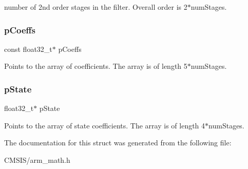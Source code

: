 number of 2nd order stages in the filter. Overall order is 2$\ast$num\+Stages. \mbox{\label{structarm__biquad__casd__df1__inst__f32_a39230f04a29d8321948e339633780442}} 
\subsubsection{\texorpdfstring{pCoeffs}{pCoeffs}}
{\footnotesize\ttfamily const float32\+\_\+t$\ast$ p\+Coeffs}

Points to the array of coefficients. The array is of length 5$\ast$num\+Stages. \mbox{\label{structarm__biquad__casd__df1__inst__f32_a335c87e6fdc4b96601d95a5de8b9c463}} 
\subsubsection{\texorpdfstring{pState}{pState}}
{\footnotesize\ttfamily float32\+\_\+t$\ast$ p\+State}

Points to the array of state coefficients. The array is of length 4$\ast$num\+Stages. 

The documentation for this struct was generated from the following file\+:\begin{DoxyCompactItemize}
\item 
C\+M\+S\+I\+S/arm\+\_\+math.\+h\end{DoxyCompactItemize}
